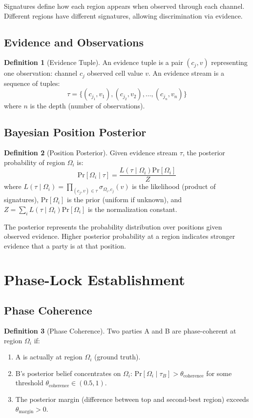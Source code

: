 \documentclass[11pt,a4paper]{article}
\theoremstyle{definition}
\newtheorem{definition}{Definition}[section]
\newcommand{\pr}[1]{\mathrm{Pr}\left[#1\right]}
\newcommand{\given}{\mid}
\begin{document}
Signatures define how each region appears when observed through each channel. Different regions have different signatures, allowing discrimination via evidence.

\subsection{Evidence and Observations}

\begin{definition}[Evidence Tuple]
An evidence tuple is a pair $(c_j, v)$ representing one observation: channel $c_j$ observed cell value $v$. An evidence stream is a sequence of tuples:
\[
\tau = \{(c_{j_1}, v_1), (c_{j_2}, v_2), \ldots, (c_{j_n}, v_n)\}
\]
where $n$ is the depth (number of observations).
\end{definition}

\subsection{Bayesian Position Posterior}

\begin{definition}[Position Posterior]
Given evidence stream $\tau$, the posterior probability of region $\Omega_i$ is:
\[
\pr{\Omega_i \given \tau} = \frac{L(\tau \given \Omega_i) \pr{\Omega_i}}{Z}
\]
where $L(\tau \given \Omega_i) = \prod_{(c_j, v) \in \tau} \sigma_{\Omega_i, c_j}(v)$ is the likelihood (product of signatures), $\pr{\Omega_i}$ is the prior (uniform if unknown), and $Z = \sum_{i} L(\tau \given \Omega_i) \pr{\Omega_i}$ is the normalization constant.
\end{definition}

The posterior represents the probability distribution over positions given observed evidence. Higher posterior probability at a region indicates stronger evidence that a party is at that position.

\section{Phase-Lock Establishment}
\label{sec:phase-lock}

\subsection{Phase Coherence}

\begin{definition}[Phase Coherence]
Two parties A and B are phase-coherent at region $\Omega_i$ if:
\begin{enumerate}
\item A is actually at region $\Omega_i$ (ground truth).
\item B's posterior belief concentrates on $\Omega_i$: $\pr{\Omega_i \given \tau_B} > \theta_{\text{coherence}}$ for some threshold $\theta_{\text{coherence}} \in (0.5, 1)$.
\item The posterior margin (difference between top and second-best region) exceeds $\theta_{\text{margin}} > 0$.
\end{enumerate}
\end{definition}
\end{document}

